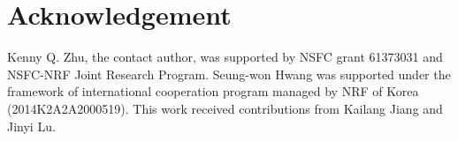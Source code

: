 \documentclass[letterpaper]{article}
\begin{document}
%
%

%





\section*{Acknowledgement}
Kenny Q. Zhu, the contact author, was supported by
NSFC grant 61373031 and NSFC-NRF Joint Research Program.
Seung-won Hwang was supported  under the framework of international 
cooperation program managed by NRF of 
Korea (2014K2A2A2000519). This work received contributions from
Kailang Jiang and Jinyi Lu.


{\small
}
%
\end{document}
